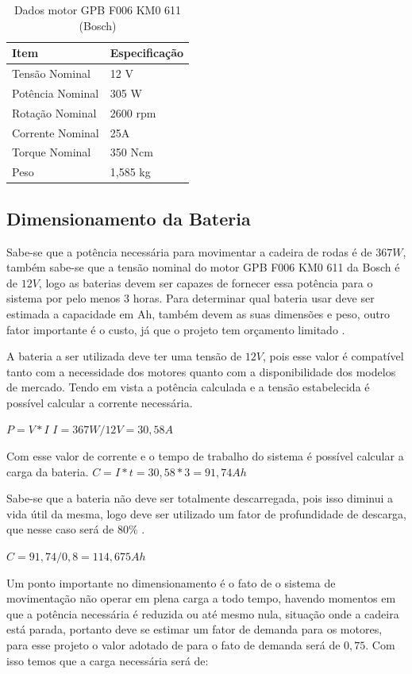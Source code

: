 \begin{table}[h]
\centering
\vspace{0.5cm}
\begin{tabular}{|l|l|}
\hline
Item                & Especificação \\
\hline
Tensão Nominal      & 12 V \\
Potência Nominal    & 305 W \\
Rotação Nominal     & 2600 rpm \\
Corrente Nominal    & 25A \\
Torque Nominal      & 350 Ncm \\
Peso                & 1,585 kg \\
\hline
\end{tabular}
\caption{Dados motor GPB F006 KM0 611 (Bosch)}
\label{tab:dadosmotor}
\end{table}

\subsection{Dimensionamento da Bateria}

Sabe-se que a potência necessária para movimentar a cadeira de rodas é de $367 W$,
também sabe-se que a tensão nominal do motor GPB F006 KM0 611 da Bosch é de $12V$,
logo as baterias devem ser capazes de fornecer essa potência para o sistema por
pelo menos 3 horas. Para determinar qual bateria usar deve ser estimada a
capacidade em Ah, também devem as suas dimensões e peso, outro fator importante
é o custo, já que o projeto tem orçamento limitado \cite{costa}.

A bateria a ser utilizada deve ter uma tensão de $12V$, pois esse valor é
compatível tanto com a necessidade dos motores quanto com a disponibilidade dos
modelos de mercado. Tendo em vista a potência calculada e a tensão estabelecida
é possível calcular a corrente necessária.

$P = V*I$
$I = 367 W / 12 V =30,58 A$

Com esse valor de corrente e o tempo de trabalho do sistema é possível calcular
a carga da bateria.
$C = I * t= 30,58 * 3 =91,74 Ah$

Sabe-se que a bateria não deve ser totalmente descarregada, pois isso diminui a
vida útil da mesma, logo deve ser utilizado um fator de profundidade de descarga,
que nesse caso será de $80\%$ \cite{KARASINSKI}.

$C=91,74/0,8 = 114,675 Ah$

Um ponto importante no dimensionamento é o fato de o sistema de movimentação não
operar em plena carga a todo tempo, havendo momentos em que a potência necessária
é reduzida ou até mesmo nula, situação onde a cadeira está parada, portanto deve
se estimar um fator de demanda para os motores, para esse projeto o valor
adotado de para o fato de demanda será de $0,75$. Com isso temos que a carga
necessária será de:

